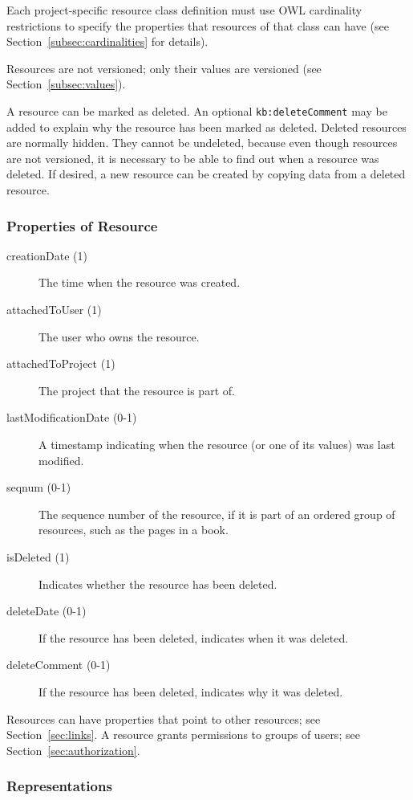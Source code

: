 \documentclass[12pt, a4paper]{article}
\begin{document}
Each project-specific resource class definition must use OWL cardinality restrictions to specify the properties that resources of that class can have (see Section~\ref{subsec:cardinalities} for details).

Resources are not versioned; only their values are versioned (see Section~\ref{subsec:values}).

A resource can be marked as deleted. An optional \texttt{kb:delete\-Comment} may be added to explain why the resource has been marked as deleted. Deleted resources are normally hidden. They cannot be undeleted, because even though resources are not versioned, it is necessary to be able to find out when a resource was deleted. If desired, a new resource can be created by copying data from a deleted resource.

\subsubsection{Properties of Resource}

\begin{description}
  \item[creationDate (1)] The time when the resource was created.
  \item[attachedToUser (1)] The user who owns the resource.
  \item[attachedToProject (1)] The project that the resource is part of.
  \item[lastModificationDate (0-1)] A timestamp indicating when the resource (or one of its values) was last modified.
  \item[seqnum (0-1)] The sequence number of the resource, if it is part of an ordered group of resources, such as the pages in a book. 
  \item[isDeleted (1)] Indicates whether the resource has been deleted.
  \item[deleteDate (0-1)] If the resource has been deleted, indicates when it was deleted.
  \item[deleteComment (0-1)] If the resource has been deleted, indicates why it was deleted.
\end{description}

Resources can have properties that point to other resources; see Section~\ref{sec:links}. A resource grants permissions to groups of users; see Section~\ref{sec:authorization}.

\subsubsection{Representations}
\end{document}
